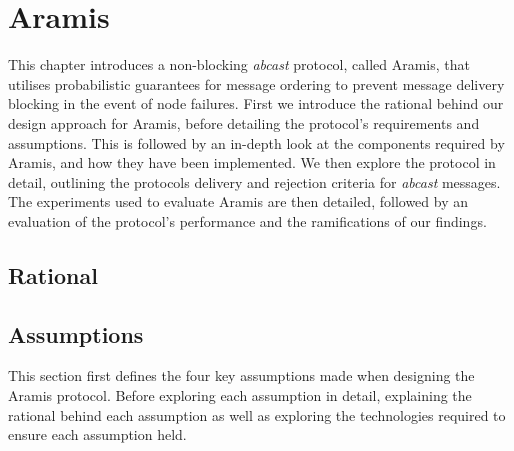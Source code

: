 \chapter{Aramis}

    \graphicspath{{Chapter4-Aramis/Figs/Vector/}{Chapter4-Aramis/Figs/}}

This chapter introduces a non-blocking \emph{abcast} protocol, called \textsf{Aramis}, that utilises probabilistic guarantees for message ordering to prevent message delivery blocking in the event of node failures.  First we introduce the rational behind our design approach for \textsf{Aramis}, before detailing the protocol's requirements and assumptions.  This is followed by an in-depth look at the components required by \textsf{Aramis}, and how they have been implemented.  We then explore the protocol in detail, outlining the protocols delivery and rejection criteria for \emph{abcast} messages.  The experiments used to evaluate \textsf{Aramis} are then detailed, followed by an evaluation of the protocol's performance and the ramifications of our findings.  

\section{Rational}
	
	
\newpage
\section{Assumptions}
	This section first defines the four key assumptions made when designing the \textsf{Aramis} protocol.  Before exploring each assumption in detail, explaining the rational behind each assumption as well as exploring the technologies required to ensure each assumption held.  


